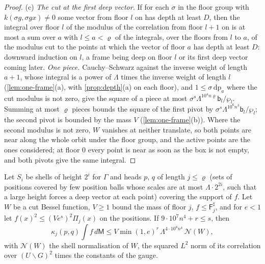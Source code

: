 \begin{proof}
(c) \emph{The cut at the first deep vector.} If for each $\sigma$ in the floor group with $k(\sigma g,\sigma gx)\ne0$ some vector from floor $l$ on has depth at least $D$, then the integral over floor $l$ of the modulus of the correlation from floor $l+1$ on is at most a
sum over $a$ with $l\le a<\varrho$ of the integrals, over the floors from $l$ to $a$, of the modulus cut to the points at which the vector of floor $a$ has depth at least $D$: downward induction on $l$, a frame being deep on floor $l$ or its first deep
vector coming later. \emph{One piece.} Cauchy--Schwarz against the inverse weight of length $a+1$, whose integral is a power of $\Lambda$ times the inverse weight of length $l$ (\cref{lem:one-frame}(a), with \cref{prop:depth}(a) on each floor), and
$1\le\sigma\,\mathrm{dp}_a$ where the cut modulus is not zero, give the square of a piece at most $\sigma^s\Lambda^{10^4n\varrho}\mathsf b_l/\wp_l$. Summing at most $\varrho$ pieces bounds the square of the first pivot by $\sigma^s\Lambda^{10^6n^3}\mathsf b_l/\wp_l$;
the second pivot is bounded by the mass $V$ (\cref{lem:one-frame}(b)). Where the second modulus is not zero, $W$ vanishes at neither translate, so both points are near along the whole orbit under the floor group, and the active points are the ones
considered; at floor $0$ every point is near as soon as the box is not empty, and both pivots give the same integral.
\end{proof}

\begin{theorem}\label{thm:shells}
Let $S_i$ be shells of height $2^i$ for $\Gamma$ and heads $p$, $q$ of length $j\le\varrho$ (sets of positions covered by few position balls whose scales are at most $\Lambda\cdot2^{2i}$, such that a large height forces a
deep vector at each point) covering the support of $f$. Let $W$ be a cut Bessel function, $V\ge1$ bound the mass of floor $j$, $f\le\mathsf F^\sharp_j$, and for $e<1$ let $f(x)^2\le(Ve^s)^2\Pi_j(x)$ on the positions. If
$9\cdot10^7n^4+r\le s$, then
\[
  \kappa_j(p,q)\int f\,d\mathsf M\le V\min(1,e)^r\,\Lambda^{4\cdot10^8n^4}\,\mathcal N(W),
\]
with $\mathcal N(W)$ the shell normalisation of $W$, the squared $L^2$ norm of its correlation over $(U\backslash G)^2$ times the constants of the gauge.
\end{theorem}


